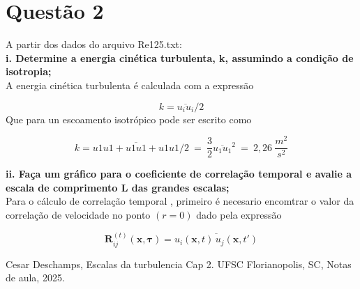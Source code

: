 \documentclass[12pt]{article}
\begin{document}
\section*{Questão 2}

A partir dos dados do arquivo Re125.txt:\\
\textbf{i. Determine a energia cinética turbulenta, k, assumindo a condição de isotropia;}\\



A energia cinética turbulenta é calculada com a expressão


\begin{equation}
	k = {\overline{u_i u_i}}/2
\end{equation}
Que para un escoamento isotrópico pode ser escrito como 

\begin{equation}
	k = {\overline{u1u1 + u1u1 + u1u1}}/2 \ = \ \frac{3}{2}\overline{u_1 u_1}^2 \ = \ 2,26 \ \frac{m^2}{s^2}
\end{equation}

\textbf{ii. Faça um gráfico para o coeficiente de correlação temporal e avalie a escala de
comprimento L das grandes escalas;}\\

Para o cálculo de correlação temporal , primeiro é necesario encomtrar o valor da correlação de velocidade no ponto $(r=0)$ dado pela expressão


\begin{equation*}
	\mathbf{R}_{ij}^{(t)}(\mathbf{x}, \boldsymbol{\tau}) = \overline{u_i(\mathbf{x}, t) \, u_j(\mathbf{x}, t')}
\end{equation*}





\begin{thebibliography}{999}
	
	
	Cesar Deschamps,
	Escalas da turbulencia Cap 2.
	UFSC Florianopolis, SC,
	Notas de aula,
	2025.
		
	
\end{thebibliography}
\end{document}
